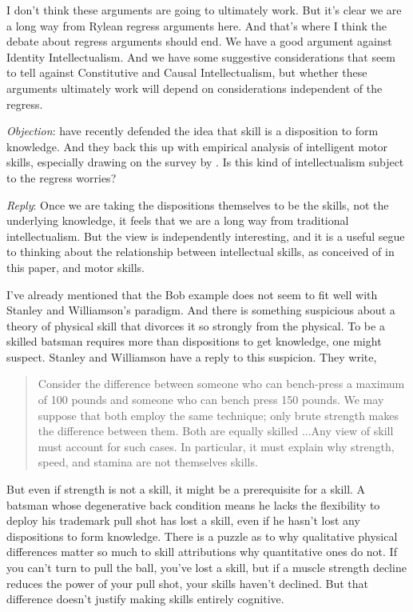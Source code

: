 I don't think these arguments are going to ultimately work. But it's clear we are a long way from Rylean regress arguments here. And that's where I think the debate about regress arguments should end. We have a good argument against Identity Intellectualism. And we have some suggestive considerations that seem to tell against Constitutive and Causal Intellectualism, but whether these arguments ultimately work will depend on considerations independent of the regress. 

\emph{Objection}: \citet{StanleyWilliamson2016} have recently defended the idea that skill is a disposition to form knowledge. And they back this up with empirical analysis of intelligent motor skills, especially drawing on the survey by \citet{Yarrow2009}. Is this kind of intellectualism subject to the regress worries?

\emph{Reply}: Once we are taking the dispositions themselves to be the skills, not the underlying knowledge, it feels that we are a long way from traditional intellectualism. But the view is independently interesting, and it is a useful segue to thinking about the relationship between intellectual skills, as conceived of in this paper, and motor skills.

I've already mentioned that the Bob example does not seem to fit well with Stanley and Williamson's paradigm. And there is something suspicious about a theory of physical skill that divorces it so strongly from the physical. To be a skilled batsman requires more than dispositions to get knowledge, one might suspect. Stanley and Williamson have a reply to this suspicion. They write,

\begin{quote}
Consider the difference between someone who can bench-press a maximum of 100 pounds and someone who can bench press 150 pounds. We may suppose that both employ the same technique; only brute strength makes the difference between them. Both are equally skilled ...Any view of skill must account for such cases. In particular, it must explain why strength, speed, and stamina are not themselves skills.\cite[9, page references to preprint]{StanleyWilliamson2016}
\end{quote}
But even if strength is not a skill, it might be a prerequisite for a skill. A batsman whose degenerative back condition means he lacks the flexibility to deploy his trademark pull shot has lost a skill, even if he hasn't lost any dispositions to form knowledge. There is a puzzle as to why qualitative physical differences matter so much to skill attributions why quantitative ones do not. If you can't turn to pull the ball, you've lost a skill, but if a  muscle strength decline reduces the power of your pull shot, your skills haven't declined. But that difference doesn't justify making skills entirely cognitive.

